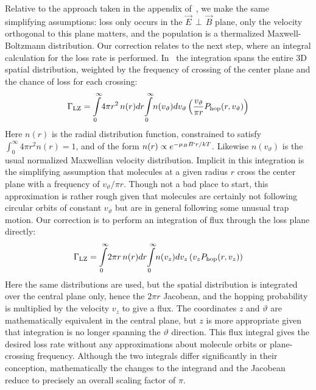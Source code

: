 \documentclass[%
 reprint,
 amsmath,amssymb,
 aps,
pra,
]{revtex4-1}
\newcommand{\epb}{{$\vec{E}\,{\perp}\,\vec{B}$}}
\begin{document}
Relative to the approach taken in the appendix of~\cite{Stuhl2013}, we make the same simplifying assumptions: loss only occurs in the \epb{} plane, only the velocity orthogonal to this plane matters, and the population is a thermalized Maxwell-Boltzmann distribution.
Our correction relates to the next step, where an integral calculation for the loss rate is performed.
In~\cite{Stuhl2013} the integration spans the entire 3D spatial distribution, weighted by the frequency of crossing of the center plane and the chance of loss for each crossing:
\begin{equation}
\Gamma_\text{LZ}=\int\displaylimits_0^\infty\!4\pi r^2\,n(r)dr\!\int\displaylimits_0^\infty \!n(v_\vartheta)dv_\vartheta\left( \frac{v_\vartheta}{\pi r} P_\text{hop}(r,v_\vartheta)\right)
\end{equation}
Here $n(r)$ is the radial distribution function, constrained to satisfy $\int_0^\infty 4\pi r^2n(r)=1$, and of the form $n(r)\propto e^{-\mu_BB`r/kT}$. 
Likewise $n(v_\vartheta)$ is the usual normalized Maxwellian velocity distribution. 
Implicit in this integration is the simplifying assumption that molecules at a given radius $r$ cross the center plane with a frequency of $v_\vartheta/\pi r$.
Though not a bad place to start, this approximation is rather rough given that molecules are certainly not following circular orbits of constant $v_\vartheta$ but are in general following some unusual trap motion.
Our correction is to perform an integration of flux through the loss plane directly:
\begin{equation}
\Gamma_\text{LZ}=\int\displaylimits_0^\infty\!2\pi r \,n(r)dr\!\int\displaylimits_0^\infty\! n(v_z)dv_z\left(v_z P_\text{hop}(r,v_z)\right)
\end{equation}
Here the same distributions are used, but the spatial distribution is integrated over the central plane only, hence the $2\pi r$ Jacobean, and the hopping probability is multiplied by the velocity $v_z$ to give a flux.
The coordinates $z$ and $\vartheta$ are mathematically equivalent in the central plane, but $z$ is more appropriate given that integration is no longer spanning the $\vartheta$ direction.
This flux integral gives the desired loss rate without any approximations about molecule orbits or plane-crossing frequency.
Although the two integrals differ significantly in their conception, mathematically the changes to the integrand and the Jacobean reduce to precisely an overall scaling factor of $\pi$.
\end{document}
